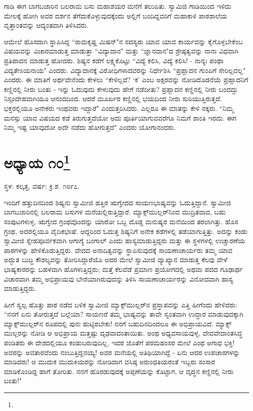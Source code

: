 ಗಾಡಿ ಈಗ ಬಾಗಬಜಾರಿನ ಬಲರಾಮ ಬಸು ಮಹಾಶಯರ ಮನೆಗೆ ತಲುಪಿತು. ಸ್ವಾಮಿಜಿ ಗಾಡಿಯಿಂದ ಇಳಿದು ಮೇಲಕ್ಕೆ ಹೋಗಿ ಅವರ ದರ್ಶನ ತೆಗೆದುಕೊಳ್ಳುವುದಕ್ಕೆಂದು ಅಲ್ಲಿಗೆ ಬಂದಿದ್ದವರಿಗೆ ಮಹಾಕಾಳಿ ಪಾಠಶಾಲೆಯ ವೃತ್ತಾಂತವನ್ನು ಆದ್ಯಂತವಾಗಿ ತಿಳಿಸಿದರು.

ಆಮೇಲೆ ಹೊಸದಾಗಿ ಸ್ಥಾಪಿಸಿದ್ದ “ರಾಮಕೃಷ್ಣ ಮಿಷನ್"ನ ಸದಸ್ಯರು ಯಾವ ಯಾವ ಕಾರ್ಯವನ್ನು ಕೈಗೊಳ್ಳಬೇಕೆಂಬ ವಿಷಯವನ್ನು ವಿಚಾರಮಾಡುತ್ತ ಮಾಡುತ್ತಾ “ವಿದ್ಯಾದಾನ" ಮತ್ತು “ಜ್ಞಾನದಾನ"ದ ಶ್ರೇಷ್ಠತ್ವವನ್ನು ನಾನಾ ವಿಧವಾಗಿ ಪ್ರತಿಪಾದನ ಮಾಡುತ್ತ ಹೋದರು. ಶಿಷ್ಯನ ಕಡೆಗೆ ಲಕ್ಷ್ಯಕೊಟ್ಟು “ವಿದ್ಯೆ ಕಲಿಸಿ, ವಿದ್ಯೆ ಕಲಿಸಿ! - ನಾನ್ಯಃ ಪಂಥಾ ವಿದ್ಯತೇಽಯನಾಯ" ಎಂದರು. ವಿದ್ಯಾದಾನಕ್ಕೆ ವಿರೋಧಿಗಳಾದವರನ್ನು ನಿರ್ಧೇಶಿಸಿ “ಪ್ರಹ್ಲಾದನ ಗುಂಪಿಗೆ ಸೇರಿಲ್ಲವಲ್ಲ" ಎಂದರು. ಈ ಮಾತಿಗೆ ಅರ್ಥವೇನೆಂದು ಕೇಳಲು “ಕೇಳಿಲ್ಲವೆ? ‘ಕ’ ಎಂಬ ಅಕ್ಷರವನ್ನು ನೋಡಿದೊಡನೆಯೆ ಪ್ರಹ್ಲಾದನಿಗೆ ಕಣ್ಣಿನಲ್ಲಿ ನೀರು ಬಂತು - ಇನ್ನು ಓದುವುದು ಕೇಳುವುದು ಹೇಗೆ ನಡೆದೀತು? ಪ್ರಹ್ಲಾದನ ಕಣ್ಣಿನಲ್ಲಿ ನೀರು ಬಂದದ್ದು ನಿಸ್ಸಂದೇಹವಾಗಿಯೂ ಆನಂದದಿಂದ. ಆದರೆ ಮೂರ್ಖರ ಕಣ್ಣಿನಲ್ಲಿ ಭಯದಿಂದ ನೀರು ಸುರಿಯುತ್ತಿರುತ್ತದೆ. ಭಕ್ತರಲ್ಲಿಯೂ ಅನೇಕರು ಇಂಥವರು ಇದ್ದಾರೆ" ಎಂದುತ್ತರಿಸಿದರು. ಎಲ್ಲರೂ ಈ ಮಾತನ್ನು ಕೇಳಿ ನಕ್ಕರು. “ನಿಮ್ಮ ಮನಸ್ಸು ಯಾವ ವಿಷಯದ ಕಡೆ ತಿರುಗುತ್ತದೆಯೋ ಅದು ಪೂರ್ತಿಯಾಗುವವರೆಗೂ ನಿಮಗೆ ಶಾಂತಿ ಇರದು. ಈಗ ನಿಮ್ಮ ಇಷ್ಟ ಯಾವುದೋ ಅದೇ ನಡೆದು ಹೋಗುತ್ತದೆ" ಎಂದರು ಯೋಗಾನಂದರು.

\newpage

\chapter[ಅಧ್ಯಾಯ ೧೦]{ಅಧ್ಯಾಯ ೧೦\protect\footnote{}}

\centerline{ಸ್ಥಳ: ಕಲ್ಕತ್ತ, ವರ್ಷ: ಕ್ರಿ.ಶ. ೧೮೯೭.}

ಇಂದಿಗೆ ಹತ್ತುದಿನದಿಂದ ಶಿಷ್ಯನು ಸ್ವಾಮೀಜಿ ಹತ್ತಿರ ಋಗ್ವೇದದ ಸಾಯಣಭಾಷ್ಯವನ್ನು ಓದುತ್ತಿದ್ದಾನೆ. ಸ್ವಾಮೀಜಿ ಬಾಗಬಜಾರಿನಲ್ಲಿ ಬಲರಾಮ ಬಸುಗಳ ಮನೆಯಲ್ಲಿರುತ್ತಿದ್ದಾರೆ. ಮ್ಯಾಕ್ಸ್‌ಮುಲ್ಲರ್‌ನಿಂದ ಮುದ್ರಿತವಾದ, ಬಹು ಸಂಪುಟಗಳುಳ್ಳ, ಋಗ್ವೇದ ಗ್ರಂಥವೊಂದನ್ನು ಯಾರೋ ಒಬ್ಬ ದೊಡ್ಡ ಮನುಷ್ಯರ ಮನೆಯಿಂದ ತರಲಾಗಿತ್ತು. ಹೊಸ ಗ್ರಂಥ, ಅದರಲ್ಲಿಯೂ ವೈದಿಕಭಾಷೆ. ಆದ್ದರಿಂದ ಓದುತ್ತ ಶಿಷ್ಯನಿಗೆ ಅನೇಕ ಕಡೆಗಳಲ್ಲಿ ತಡೆಯಾಗುತ್ತಿತ್ತು. ಅದನ್ನು ಕಂಡು ಸ್ವಾಮೀಜಿ ಸ್ನೇಹಪೂರ್ವಕವಾಗಿ ಆಗಾಗ್ಯೆ ಬಂಗಾಲ್ ಎಂದು ಹಾಸ್ಯಮಾಡುತ್ತಿದ್ದರು ಮತ್ತು ಈ ಸ್ಥಳಗಳಲ್ಲಿ ಉಚ್ಚಾರಣೆಯ ಪಾಠಗಳನ್ನು ಹೇಳಿಕೊಡುತ್ತಿದ್ದರು. ವೇದದ ಅನಾದಿತ್ವವನ್ನು ಸ್ಥಾಪಿಸುವುದಕ್ಕೆ ಸಾಯಣಾಚಾರ್ಯರು ತಮ್ಮ ಯಾವ ಅದ್ಭುತ ಬುದ್ಧಿ ಕೌಶಲ್ಯವನ್ನು ತೋರಿಸಿದ್ದಾರೆಯೊ ಅದರ ಮೇಲೆ ಸ್ವಾಮೀಜಿ ವ್ಯಾಖ್ಯಾನ ಮಾಡುತ್ತ ಕೆಲವು ವೇಳೆ ಭಾಷ್ಯಕಾರರನ್ನು ಬಹಳವಾಗಿ ಹೊಗಳುತ್ತಿದ್ದರು; ಮತ್ತೆ ಕೆಲವೆಡೆ ಪ್ರಮಾಣ ಪ್ರಯೋಗದಲ್ಲಿ ಅಥವಾ ಪದದ ಗೂಢಾರ್ಥ ವಿಚಾರವಾಗಿ ತಮ್ಮ ಅಭಿಪ್ರಾಯವು ಬೇರೆಯಾಗಿರುವುದನ್ನು ತಿಳಿಸಿ ಸಾಯಣಾಚಾರ್ಯರನ್ನು ವಿನೋದವಾಗಿ ಹಾಸ್ಯ ಮಾಡುತ್ತಿದ್ದರು.

ಹೀಗೆ ಸ್ವಲ್ಪ ಹೊತ್ತು ಪಾಠ ನಡೆದ ಬಳಿಕ ಸ್ವಾಮೀಜಿ ಮ್ಯಾಕ್ಸ್‌ಮುಲ್ಲರ್‌ನ ಪ್ರಸ್ತಾಪವನ್ನು ಎತ್ತಿ ಹೀಗೆಂದು ಹೇಳಿದರು: “ನನಗೆ ಏನು ತೋರುತ್ತದೆ ಬಲ್ಲೆಯಾ? ಸಾಯಣರೆ ತಮ್ಮ ಭಾಷ್ಯವನ್ನು ತಾವೇ ಸ್ವಂತವಾಗಿ ಉದ್ಧಾರ ಮಾಡುವುದಕ್ಕಾಗಿ ಮ್ಯಾಕ್ಸ್‌ಮುಲ್ಲರ್‌ನ ರೂಪದಲ್ಲಿ ಪುನಃ ಹುಟ್ಟಿರಬೇಕು! ನನಗೆ ಬಹುದಿನದಿಂದಲೂ ಈ ಅಭಿಪ್ರಾಯವಿದೆ. ಮ್ಯಾಕ್ಸ್ ಮುಲ್ಲರನ್ನು ನೋಡಿ ಆ ಅಭಿಪ್ರಾಯ ಮತ್ತಷ್ಟು ದೃಢವಾದಂತಾಯಿತು. ಅಂಥ ಅಧ್ಯವಸಾಯವುಳ್ಳ, ವೇದವೇದಾಂತಸಿದ್ಧ ಪಂಡಿತರು ಈ ದೇಶದಲ್ಲಿಯೂ ಕಂಡುಬರುವುದಿಲ್ಲ. ಇದರ ಜೊತೆಗೆ ಪರಮಹಂಸರ ಮೇಲೆ ಎಂಥ ಅಗಾಧ ಭಕ್ತಿ! ಅವರನ್ನು ಅವತಾರವೆಂದು ನಂಬುತ್ತಿದ್ದನಯ್ಯ! ಅವರ ಮನೆಯಲ್ಲಿ ಅತಿಥಿಯಾಗಿದ್ದೆ - ಏನು ಆದರ ಉಪಚಾರಗಳನ್ನು ಮಾಡಿದರು! ಆ ಮುದುಕ ಮುದುಕಿಯರನ್ನು ನೋಡಿದಾಗ ವಸಿಷ್ಠ ಅರುಂಧತಿಯರಂತೆ ಇಬ್ಬರು ಸಂಸಾರ ಮಾಡಿಕೊಂಡಿದ್ದ ಹಾಗೆ ತೋರಿತು. ನನಗೆ ಹೊರಡುವುದಕ್ಕೆ ಅಪ್ಪಣೆಯನ್ನು ಕೊಟ್ಟಾಗ, ಆ ವೃದ್ಧನ ಕಣ್ಣಿನಲ್ಲಿ ನೀರು ಬಂತು!"

